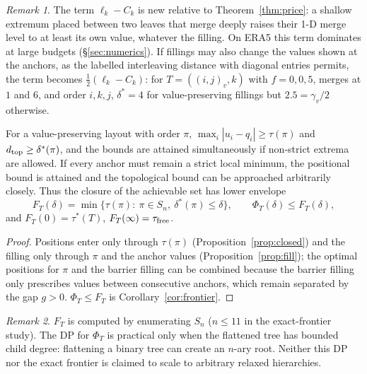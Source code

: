 \documentclass[11pt]{article}
\theoremstyle{remark}\newtheorem{remark}{Remark}
\begin{document}
\begin{remark}The term $\ell_k-C_k$ is new relative to Theorem~\ref{thm:price}: a shallow extremum placed between two leaves that merge deeply raises their 1-D merge level to at least its own value, whatever the filling. On ERA5 this term dominates at large budgets (\S\ref{sec:numerics}). If fillings may also change the values shown at the anchors, as the labelled interleaving distance with diagonal entries permits, the term becomes $\frac12(\ell_k-C_k)$: for $T=((i,j)_v,k)$ with $f=0,0,5$, merges at $1$ and $6$, and order $i,k,j$, $\delta^*=4$ for value-preserving fillings but $2.5=\gamma_v/2$ otherwise.\end{remark}

\begin{theorem}\label{thm:exactfrontier}
For a value-preserving layout with order $\pi$, $\max_i|u_i-q_i|\ge\tau(\pi)$ and $d_{\rm top}\ge\delta^*(\pi)$, and the bounds are attained simultaneously if non-strict extrema are allowed. If every anchor must remain a strict local minimum, the positional bound is attained and the topological bound can be approached arbitrarily closely. Thus the closure of the achievable set has lower envelope
\[F_T(\delta)=\min\{\tau(\pi):\ \pi\in S_n,\ \delta^*(\pi)\le\delta\},\qquad \Phi_T(\delta)\le F_T(\delta),\]
and $F_T(0)=\tau^*(T)$, $F_T(\infty)=\tau_{\rm free}$.
\end{theorem}
\begin{proof}Positions enter only through $\tau(\pi)$ (Proposition~\ref{prop:closed}) and the filling only through $\pi$ and the anchor values (Proposition~\ref{prop:fill}); the optimal positions for $\pi$ and the barrier filling can be combined because the barrier filling only prescribes values between consecutive anchors, which remain separated by the gap $g>0$. $\Phi_T\le F_T$ is Corollary~\ref{cor:frontier}.\end{proof}
\begin{remark}$F_T$ is computed by enumerating $S_n$ ($n\le11$ in the exact-frontier study). The DP for $\Phi_T$ is practical only when the flattened tree has bounded child degree: flattening a binary tree can create an $n$-ary root. Neither this DP nor the exact frontier is claimed to scale to arbitrary relaxed hierarchies.\end{remark}
\end{document}
